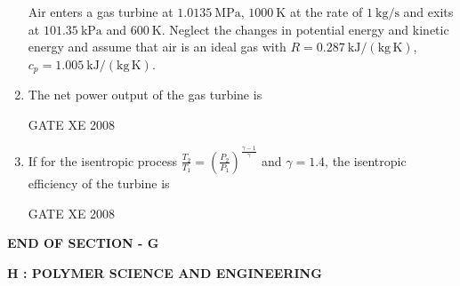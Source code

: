 \documentclass[12pt]{article}
\begin{document}
\begin{enumerate}
Air enters a gas turbine at $1.0135~\mathrm{MPa}$, $1000~\mathrm{K}$ at the rate of $1~\mathrm{kg/s}$ and exits at $101.35~\mathrm{kPa}$ and $600~\mathrm{K}$.  
Neglect the changes in potential energy and kinetic energy and assume that air is an ideal gas with $R = 0.287~\mathrm{kJ/(kg\,K)}$, $c_p = 1.005~\mathrm{kJ/(kg\,K)}$.  

\item The net power output of the gas turbine is 

\begin{enumerate}
\end{enumerate}

GATE XE 2008  

\item If for the isentropic process  
$
\frac{T_2}{T_1} = \left( \frac{P_2}{P_1} \right)^{\frac{\gamma-1}{\gamma}}
$ 
and $\gamma = 1.4$, the isentropic efficiency of the turbine is  

\begin{enumerate}
\end{enumerate}

GATE XE 2008  

\end{enumerate}

\begin{center}
    \textbf{END OF SECTION - G}
\end{center}

\newpage

\begin{center}
    \textbf{\Large H : POLYMER SCIENCE AND ENGINEERING}
\end{center}
\end{document}
